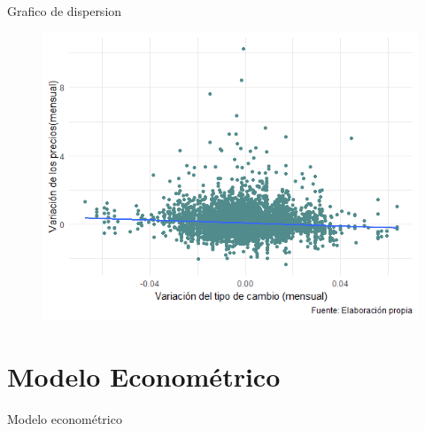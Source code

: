 \documentclass[xcolor=dvipsnames]{beamer}
\begin{document}
\begin{frame}
Grafico de dispersion
\begin{figure}
  \centering
  \includegraphics[scale=0.60]{grafico_dispersion.png}
\end{figure}
\end{frame}

\section{Modelo Econom\'etrico}

\begin{frame}
Modelo econom\'etrico
\end{frame}
\end{document}
